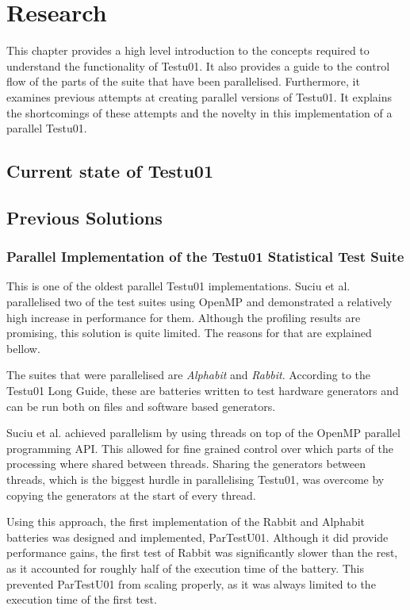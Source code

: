 \chapter{Research}
\label{cha:res}
This chapter provides a high level introduction to the concepts required to understand the functionality of Testu01. It also provides a guide to the control flow of the parts of the suite that have been parallelised. 
Furthermore, it examines previous attempts at creating parallel versions of Testu01. It explains the shortcomings of these attempts and the novelty in this implementation of a parallel Testu01.

\section{Current state of Testu01}
\section{Previous Solutions}
\subsection{Parallel Implementation of the Testu01 Statistical Test Suite}
This is one of the oldest parallel Testu01 implementations. Suciu et al. parallelised two of the test suites using OpenMP and demonstrated a relatively high increase in performance for them. Although the profiling results are promising, this solution is quite limited. The reasons for that are explained bellow.

The suites that were parallelised are \textit{Alphabit} and \textit{Rabbit}. According to the Testu01 Long Guide\cite{longguide-alphabit}, these are batteries written to test hardware generators and can be run both on files and software based generators.

Suciu et al. achieved parallelism by using threads on top of the OpenMP parallel programming API\cite{openmp}. This allowed for fine grained control over which parts of the processing where shared between threads. Sharing the generators between threads, which is the biggest hurdle in parallelising Testu01, was overcome by copying the generators at the start of every thread. 

Using this approach, the first implementation of the Rabbit and Alphabit batteries was designed and implemented, ParTestU01. Although it did provide performance gains, the first test of Rabbit was significantly slower than the rest, as it accounted for roughly half of the execution time of the battery. This prevented ParTestU01 from scaling properly, as it was always limited to the execution time of the first test.

